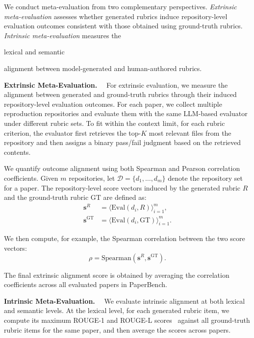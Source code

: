 \documentclass[11pt]{article}
\newif\ifreview
\newcommand{\hh}[1]{%
\ifreview
{\textcolor{orange!90!black}{#1}}
\else
#1
\fi
}
\begin{document}
We conduct meta-evaluation from two complementary perspectives. \textit{Extrinsic meta-evaluation} assesses whether generated rubrics induce repository-level evaluation outcomes consistent with those obtained using ground-truth rubrics. \textit{Intrinsic meta-evaluation} measures the \hh{lexical and semantic} alignment between model-generated and human-authored rubrics.

\noindent\textbf{Extrinsic Meta-Evaluation.}~~
For extrinsic evaluation, we measure the alignment between generated and ground-truth rubrics through their induced repository-level evaluation outcomes. For each paper, we collect multiple reproduction repositories and evaluate them with the same LLM-based evaluator under different rubric sets. To fit within the context limit, for each rubric criterion, the evaluator first retrieves the top-$K$ most relevant files from the repository and then assigns a binary pass/fail judgment based on the retrieved contents.

We quantify outcome alignment using both Spearman and Pearson correlation coefficients. Given $m$ repositories, let $\mathcal{D}=\{d_1,\dots,d_m\}$ denote the repository set for a paper. The repository-level score vectors induced by the generated rubric $R$ and the ground-truth rubric $\mathrm{GT}$ are defined as:
\begin{equation}
\begin{split}
    \mathbf{s}^{R}
    &=
    \langle
    \mathrm{Eval}(d_i, R)
    \rangle_{i=1}^{m}, \\
    \mathbf{s}^{\mathrm{GT}}
    &=
    \langle
    \mathrm{Eval}(d_i, \mathrm{GT})
    \rangle_{i=1}^{m}.
\end{split}
\end{equation}

We then compute, for example, the Spearman correlation between the two score vectors:
\begin{equation}
    \rho
    =
    \mathrm{Spearman}
    \left(
    \mathbf{s}^{R},
    \mathbf{s}^{\mathrm{GT}}
    \right).
\end{equation}

The final extrinsic alignment score is obtained by averaging the correlation coefficients across all evaluated papers in PaperBench.


\noindent\textbf{Intrinsic Meta-Evaluation.}~~
We evaluate intrinsic alignment at both lexical and semantic levels. At the lexical level, for each generated rubric item, we compute its maximum ROUGE-1 and ROUGE-L scores~\cite{lin-2004-rouge} against all ground-truth rubric items for the same paper, and then average the scores across papers.
\end{document}
